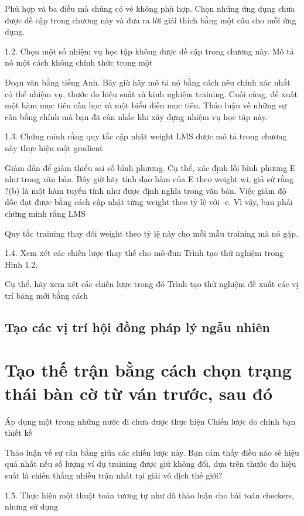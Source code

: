 Phù hợp và ba điều mà chúng có vẻ không phù hợp. Chọn những ứng dụng chưa được đề cập trong chương này và đưa ra lời giải thích bằng một câu cho mỗi ứng dụng.

1.2. Chọn một số nhiệm vụ học tập không được đề cập trong chương này. Mô tả nó một cách không chính thức trong một

Đoạn văn bằng tiếng Anh. Bây giờ hãy mô tả nó bằng cách nêu chính xác nhất có thể nhiệm vụ, thước đo hiệu suất và kinh nghiệm training. Cuối cùng, đề xuất một hàm mục tiêu cần học và một biểu diễn mục tiêu. Thảo luận về những sự cân bằng chính mà bạn đã cân nhắc khi xây dựng nhiệm vụ học tập này.

1.3. Chứng minh rằng quy tắc cập nhật weight LMS được mô tả trong chương này thực hiện một gradient

Giảm dần để giảm thiểu sai số bình phương. Cụ thể, xác định lỗi bình phương E như trong văn bản. Bây giờ hãy tính đạo hàm của E theo weight wi, giả sử rằng ?(b) là một hàm tuyến tính như được định nghĩa trong văn bản. Việc giảm độ dốc đạt được bằng cách cập nhật từng weight theo tỷ lệ với -e. Vì vậy, bạn phải chứng minh rằng LMS

Quy tắc training thay đổi weight theo tỷ lệ này cho mỗi mẫu training mà nó gặp.

1.4. Xem xét các chiến lược thay thế cho mô-đun Trình tạo thử nghiệm trong Hình 1.2.

Cụ thể, hãy xem xét các chiến lược trong đó Trình tạo thử nghiệm đề xuất các vị trí bảng mới bằng cách

\subsection{Tạo các vị trí hội đồng pháp lý ngẫu nhiên}

\section{Tạo thế trận bằng cách chọn trạng thái bàn cờ từ ván trước, sau đó}

Áp dụng một trong những nước đi chưa được thực hiện Chiến lược do chính bạn thiết kế

Thảo luận về sự cân bằng giữa các chiến lược này. Bạn cảm thấy điều nào sẽ hiệu quả nhất nếu số lượng ví dụ training được giữ không đổi, dựa trên thước đo hiệu suất là chiến thắng nhiều trận nhất tại giải vô địch thế giới?

1.5. Thực hiện một thuật toán tương tự như đã thảo luận cho bài toán checkers, nhưng sử dụng

